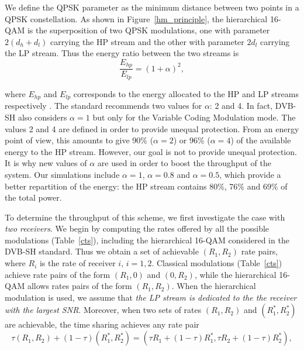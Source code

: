 \documentclass[conference, letterpaper]{IEEEtran}
\begin{document}
We define the QPSK parameter as the minimum distance between two points in a QPSK constellation. As shown in Figure~\ref{hm_principle}, the hierarchical 16-QAM is the superposition of two QPSK modulations, one with parameter $2(d_h+d_l)$ carrying the HP stream and the other with parameter $2d_l$ carrying the LP stream. Thus the energy ratio between the two streams is
\begin{equation}
\frac{E_{hp}}{E_{lp}} = (1+\alpha)^2 ,
\end{equation}

\noindent where $E_{hp}$ and $E_{lp}$ corresponds to the energy allocated to the HP and LP streams respectively \cite{local_content}. The standard \cite{sh} recommends two values for $\alpha$: 2 and 4. In fact, DVB-SH also considers $\alpha=1$ but only for the Variable Coding Modulation mode. The values 2 and 4 are defined in order to provide unequal protection. From an energy point of view, this amounts to give 90\% ($\alpha=2$) or 96\% ($\alpha=4$) of the available energy to the HP stream. However, our goal is not to provide unequal protection. It is why new values of $\alpha$ are used in order to boost the throughput of the system. Our simulations include $\alpha=1$, $\alpha=0.8$ and $\alpha=0.5$, which provide a better repartition of the energy: the HP stream contains 80\%, 76\% and 69\% of the total power. 

To determine the throughput of this scheme, we first investigate the case with \emph{two receivers}. We begin by computing the rates offered by all the possible modulations (Table~\ref{cts}), including the hierarchical 16-QAM considered in the DVB-SH standard. Thus we obtain a set of achievable $(R_1, R_2)$ rate pairs, where $R_i$ is the rate of receiver $i$, $i=1,2$. Classical modulations (Table~\ref{cts}) achieve rate pairs of the form $(R_1,0)$ and $(0,R_2)$, while the hierarchical 16-QAM allows rates pairs of the form $(R_1, R_2)$. When the hierarchical modulation is used, we assume that \emph{the LP stream is dedicated to the the receiver with the largest SNR}. Moreover, when two sets of rates $(R_1,R_2)$ and $\left(R_1^*,R_2^*\right)$ are achievable, the time sharing achieves any rate pair 
\begin{equation}
\scriptstyle
\tau (R_1,R_2) + (1-\tau)(R_1^*,R_2^*) = (\tau R_1+(1-\tau)R_1^* , \tau R_2+(1-\tau)R_2^* ) ,
\end{equation}
\end{document}
